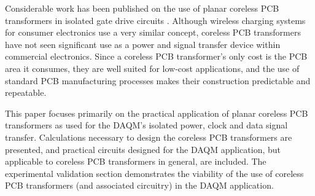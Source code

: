 \documentclass[conference]{IEEEtran}
\begin{document}

Considerable work has been published on the use of planar coreless PCB transformers in isolated gate drive circuits \cite{TangHuiFundamental,NaturallySoft,OptimalOperation,CorelessGateDrive}.  Although wireless charging systems for consumer electronics use a very similar concept, coreless PCB transformers have not seen significant use as a power and signal transfer device within commercial electronics.  Since a coreless PCB transformer's only cost is the PCB area it consumes, they are well suited for low-cost applications, and the use of standard PCB manufacturing processes makes their construction predictable and repeatable.

This paper focuses primarily on the practical application of planar coreless PCB transformers as used for the DAQM's isolated power, clock and data signal transfer.  Calculations necessary to design the coreless PCB transformers are presented, and practical circuits designed for the DAQM application, but applicable to coreless PCB transformers in general, are included.  The experimental validation section demonstrates the viability of the use of coreless PCB transformers (and associated circuitry) in the DAQM application.
\end{document}
